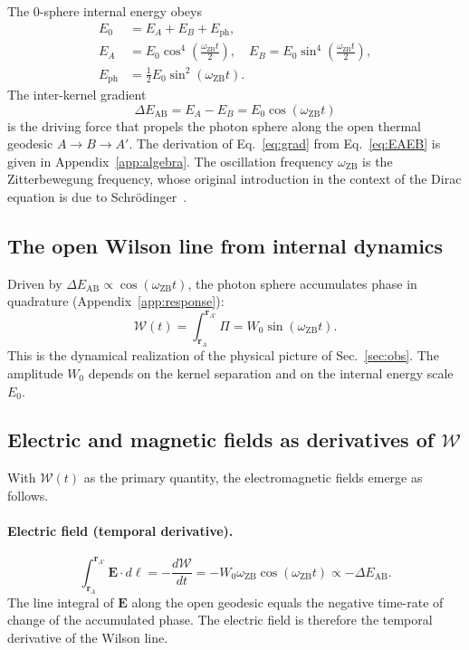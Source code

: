 \documentclass[%
 reprint, amsmath,amssymb, aps, prb, ]{revtex4-2}
\numberwithin{equation}{section}
\newcommand{\omZB}{\omega_{\text{ZB}}}
\newcommand{\EphS}{E_{\text{ph}}}
\newcommand{\Egrad}{\Delta E_{\text{AB}}}
\newcommand{\WL}{\mathcal{W}}
\begin{document}
The 0-sphere internal energy obeys~\cite{hanamura01,hanamura33}
\begin{align}
E_0 &= E_A + E_B + \EphS,\label{eq:energy}\\
E_A &= E_0\cos^4\!\!\left(\tfrac{\omZB t}{2}\right),\quad
E_B = E_0\sin^4\!\!\left(\tfrac{\omZB t}{2}\right),\label{eq:EAEB}\\
\EphS &= \tfrac{1}{2}E_0\sin^2(\omZB t).\label{eq:Eph}
\end{align}
The inter-kernel gradient
\begin{equation}
\Egrad = E_A - E_B = E_0\cos(\omZB t)
\label{eq:grad}
\end{equation}
is the driving force that propels the photon sphere along the open thermal geodesic $A\to B\to A'$. The derivation of Eq.~\eqref{eq:grad} from Eq.~\eqref{eq:EAEB} is given in Appendix~\ref{app:algebra}. The oscillation frequency $\omZB$ is the Zitterbewegung frequency, whose original introduction in the context of the Dirac equation is due to Schr\"odinger~\cite{Schrodinger1930}.

\subsection{The open Wilson line from internal dynamics}

Driven by $\Egrad \propto \cos(\omZB t)$, the photon sphere accumulates phase in quadrature (Appendix~\ref{app:response}):
\begin{equation}
\WL(t) = \int_{\mathbf{r}_A}^{\mathbf{r}_{A'}}\Pi = W_0\sin(\omZB t).
\label{eq:WL_dyn}
\end{equation}
This is the dynamical realization of the physical picture of Sec.~\ref{sec:obs}. The amplitude $W_0$ depends on the kernel separation and on the internal energy scale $E_0$.

\subsection{Electric and magnetic fields as derivatives of $\WL$}

With $\WL(t)$ as the primary quantity, the electromagnetic fields emerge as follows.

\paragraph{Electric field (temporal derivative).}
\begin{equation}
\int_{\mathbf{r}_A}^{\mathbf{r}_{A'}}\mathbf{E}\cdot d\bm{\ell}
= -\frac{d\WL}{dt} = -W_0\omZB\cos(\omZB t)
\propto -\Egrad.
\label{eq:E_from_WL}
\end{equation}
The line integral of $\mathbf{E}$ along the open geodesic equals the negative time-rate of change of the accumulated phase. The electric field is therefore the temporal derivative of the Wilson line.
\end{document}
